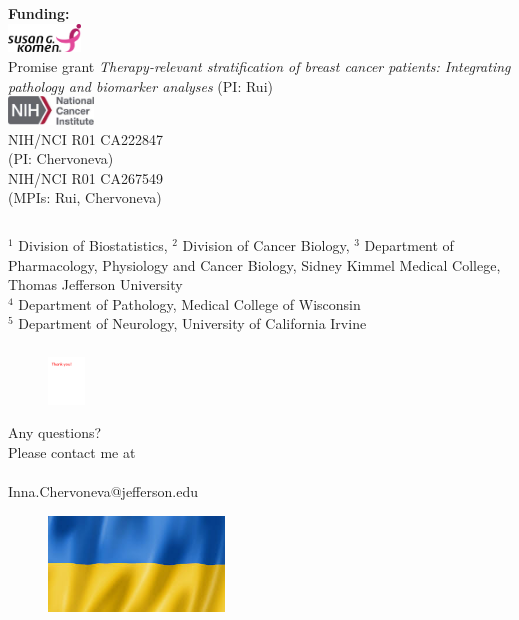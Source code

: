 \documentclass[t,8pt]{beamer}
\begin{document}
\begin{frame}
\begin{columns}[T]
		      	  \begin{column}{0.4\textwidth}
	             \textbf{Funding:}\\
                      \includegraphics[height=0.3in] {Figures/Komen.png}\\
Promise grant \textit{Therapy-relevant stratification of breast cancer patients:  Integrating pathology and biomarker analyses} (PI: Rui)\\
\bigskip
			 \includegraphics[height=0.3in] {Figures/NCI.jpeg}\\
		 \color{red}
			  NIH/NCI R01 CA222847\\
			(PI: Chervoneva)\\	
			\color{black}
		  NIH/NCI R01 CA267549\\
		 (MPIs: Rui, Chervoneva)\\
		      \end{column}	
	\end{columns}	
 $^{1}$ Division of Biostatistics,   $^{2}$ Division of Cancer Biology, 
 $^{3}$ Department of Pharmacology, Physiology and Cancer Biology,  Sidney Kimmel Medical College, Thomas Jefferson University\\
 $^{4}$ Department of Pathology, Medical College of Wisconsin\\
  $^{5}$ Department of Neurology, University of California Irvine
\end{frame}	
	\frame
	{\frametitle { }  
		\begin{figure}
			\includegraphics[height=0.5in] {Figures/Thank_you.pdf}
		\end{figure} 
\begin{center}		
\begin{huge}		
Any questions? \\
Please contact me at \\
\\
Inna.Chervoneva@jefferson.edu
\end{huge}	
\end{center}
\bigskip		
		\begin{figure}
     \includegraphics[height=1in] {Figures/Ukr_flag.jpeg}
\end{figure} 
	}  
	

	
\end{document}
